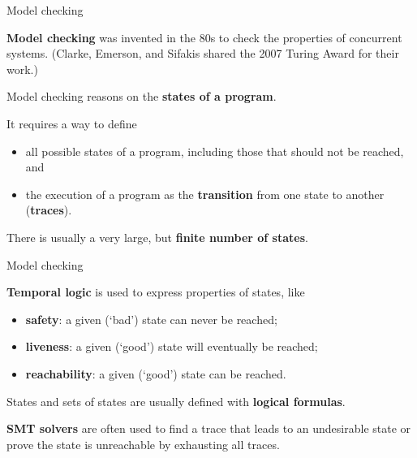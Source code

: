 \documentclass[compress,dvips,xcolor={dvipsnames},t]{beamer}
\begin{document}
%
\begin{frame}{Model checking}

  \textbf{Model checking} was invented in the 80s to check the
  properties of concurrent systems.  (Clarke, Emerson, and Sifakis
  shared the 2007 Turing Award for their work.)

  \bigskip

  Model checking reasons on the \textbf{states of a program}.

  \bigskip

  It requires a way to define
  \begin{itemize}

    \item all possible states of a program, including those that
      should not be reached, and

    \item the execution of a program as the \textbf{transition} from
      one state to another (\textbf{traces}).

  \end{itemize}

  \medskip

  There is usually a very large, but \textbf{finite number of states}.

\end{frame}

%
\begin{frame}{Model checking}

  \textbf{Temporal logic} is used to express properties of states,
  like
  \begin{itemize}

    \item \textbf{safety}: a given (`bad') state can never be
      reached;

    \item \textbf{liveness}: a given (`good') state will eventually
      be reached;

    \item \textbf{reachability}: a given (`good') state can be
      reached.

  \end{itemize}

  \medskip

  States and sets of states are usually defined with \textbf{logical
    formulas}.

  \bigskip

  \textbf{SMT solvers} are often used to find a trace that leads to an
  undesirable state or prove the state is unreachable by exhausting
  all traces.

\end{frame}
\end{document}
